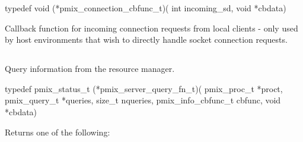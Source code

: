 \format

\cspecificstart
\begin{codepar}
typedef void (*pmix_connection_cbfunc_t)(
                             int incoming_sd, void *cbdata)
\end{codepar}
\cspecificend

\begin{arglist}
\end{arglist}

\descr

Callback function for incoming connection requests from local clients - only used by host environments that wish to directly handle socket connection requests.



\subsection{}

\summary

Query information from the resource manager.

\format

\cspecificstart
\begin{codepar}
typedef pmix_status_t (*pmix_server_query_fn_t)(
                             pmix_proc_t *proct,
                             pmix_query_t *queries, size_t nqueries,
                             pmix_info_cbfunc_t cbfunc,
                             void *cbdata)
\end{codepar}
\cspecificend

\begin{arglist}
\end{arglist}

Returns one of the following:

